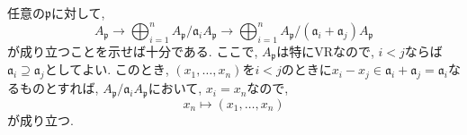 \documentclass[dvipdfmx]{jsarticle}
\begin{document}
    \begin{problem}
       任意の$\mathfrak{p}$に対して,
       \[
            A_\mathfrak{p} \longrightarrow \bigoplus_{i = 1}^n A_\mathfrak{p}/\mathfrak{a}_i A_\mathfrak{p} \longrightarrow \bigoplus_{i = 1}^n  A_\mathfrak{p}/(\mathfrak{a}_i + \mathfrak{a}_j) A_\mathfrak{p}
       \]
       が成り立つことを示せば十分である.
       ここで, $A_\mathfrak{p}$は特にVRなので, $i < j$ならば$\mathfrak{a}_i \supseteq \mathfrak{a}_j$としてよい.
       このとき, $(x_1, \dots, x_n)$を$i < j$のときに$x_i-x_j \in \mathfrak{a}_i + \mathfrak{a}_j = \mathfrak{a}_i$なるものとすれば,
       $A_\mathfrak{p}/\mathfrak{a}_iA_\mathfrak{p}$において, $x_i = x_n$なので,
       \[
        x_n \longmapsto (x_1, \dots, x_n)
       \]
       が成り立つ.
    \end{problem}
\end{document}

